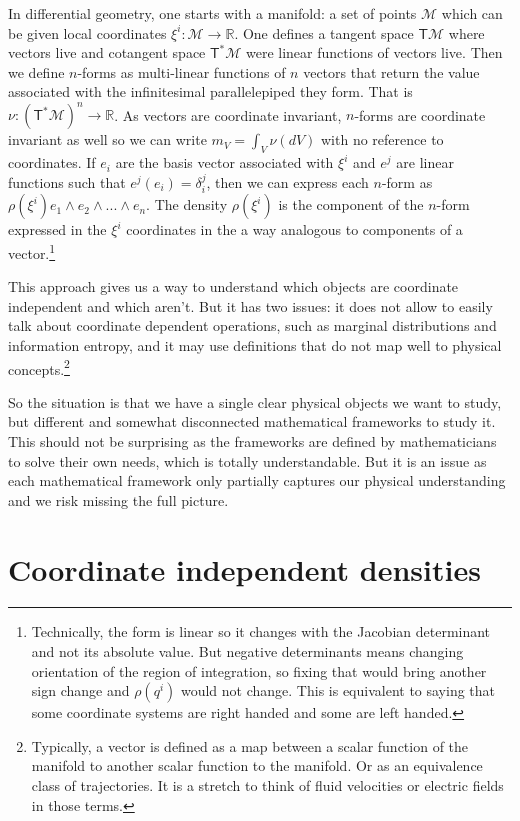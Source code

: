\documentclass[11pt]{article}
\begin{document}
In differential geometry, one starts with a manifold: a set of points $\mathcal{M}$ which can be given local coordinates $\xi^i : \mathcal{M} \to \mathbb{R}$. One defines a tangent space $\mathsf{T}\mathcal{M}$ where vectors live and cotangent space $\mathsf{T}^*\mathcal{M}$ were linear functions of vectors live. Then we define $n$-forms as multi-linear functions of $n$ vectors that return the value associated with the infinitesimal parallelepiped they form. That is $\nu : (\mathsf{T}^*\mathcal{M})^n \rightarrow \mathbb{R}$. As vectors are coordinate invariant, $n$-forms are coordinate invariant as well so we can write $m_V=\int_V \nu(dV)$ with no reference to coordinates. If $e_i$ are the basis vector associated with $\xi^i$ and $e^j$ are linear functions such that $e^j(e_i)=\delta_i^j$, then we can express each $n$-form as $\rho(\xi^i)e_1\wedge e_2 \wedge ... \wedge e_n$. The density $\rho(\xi^i)$ is the component of the $n$-form expressed in the $\xi^i$ coordinates in the a way analogous to components of a vector.\footnote{Technically, the form is linear so it changes with the Jacobian determinant and not its absolute value. But negative determinants means changing orientation of the region of integration, so fixing that would bring another sign change and $\rho(q^i)$ would not change. This is equivalent to saying that some coordinate systems are right handed and some are left handed.}

This approach gives us a way to understand which objects are coordinate independent and which aren't. But it has two issues: it does not allow to easily talk about coordinate dependent operations, such as marginal distributions and information entropy, and it may use definitions that do not map well to physical concepts.\footnote{Typically, a vector is defined as a map between a scalar function of the manifold to another scalar function to the manifold. Or as an equivalence class of trajectories. It is a stretch to think of fluid velocities or electric fields in those terms.}

So the situation is that we have a single clear physical objects we want to study, but different and somewhat disconnected mathematical frameworks to study it. This should not be surprising as the frameworks are defined by mathematicians to solve their own needs, which is totally understandable. But it is an issue as each mathematical framework only partially captures our physical understanding and we risk missing the full picture.

\section{Coordinate independent densities}
\end{document}

